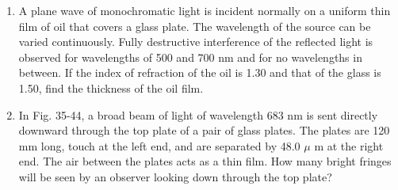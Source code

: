 \documentclass[fleqn]{article}
\begin{document}
\begin{enumerate}
    \item A plane wave of monochromatic light is incident normally on a uniform thin film of oil that covers a glass plate. The wavelength of the source can be varied continuously. Fully destructive interference of the reflected light is observed for wavelengths of 500 and 700 nm and for no wavelengths in between. If the index of refraction of the oil is 1.30 and that of the glass is 1.50, find the thickness of the oil film.
    
    \item In Fig. 35-44, a broad beam of light of wavelength 683 nm is sent directly downward through the top plate of a pair of glass plates. The plates are 120 mm long, touch at the left end, and are separated by 48.0 $\mu$ m at the right end. The air between the plates acts as a thin film. How many bright fringes will be seen by an observer looking down through the top plate?
    
  \end{enumerate}
\end{document}
